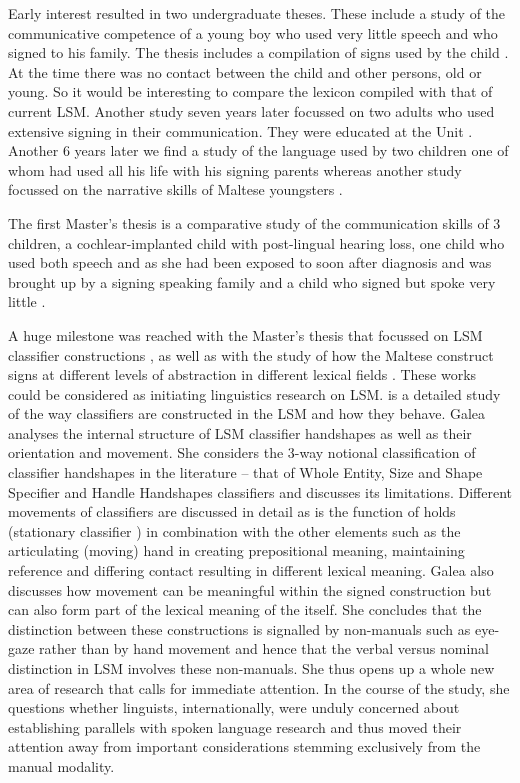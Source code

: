 \documentclass[output=paper]{langsci/langscibook}
\begin{document}
\newpage 
Early interest resulted in two undergraduate theses.  These include a
study of the communicative competence of a young  boy who used
very little speech and who signed to his family.  The thesis includes
a compilation of signs used by the child \citep{d88}.  At
the time there was no contact between the child and other 
persons, old or young.  So it would be interesting to compare the
lexicon compiled with that of current LSM. Another study seven years
later focussed on two  adults who used extensive signing in their
communication.  They were educated at the  Unit
\citep{p95}. Another 6 years later we find a study of the 
language used by two children one of whom had used  all
his life with his signing  parents \citep{azz2001} whereas
another %
study focussed on the narrative skills of Maltese youngsters
\citep{f02}.

The first Master’s thesis is a comparative study of the communication
skills of 3  children, a cochlear-implanted child with
post-lingual hearing loss, one  child who used both speech and
 as she had been exposed to  soon after diagnosis and was
brought up by a signing speaking family and a  child who signed
but spoke very little \citep{a05}.

A huge milestone was reached with the Master’s thesis that focussed on
LSM classifier constructions \citep{g06}, as well as with the
study of how the Maltese  construct signs at different levels of
abstraction in different lexical fields \citep{m10}. These
works could be considered as initiating  linguistics research on
LSM. \citet{g06} is a detailed study of the way classifiers are
constructed in the LSM and how they behave. Galea analyses the
internal structure of LSM classifier handshapes as well as their
orientation and movement.  She considers the 3-way notional
classification of classifier handshapes in the literature – that of
Whole Entity, Size and Shape Specifier and Handle Handshapes
classifiers and discusses its limitations.  Different movements of
classifiers are discussed in detail as is the function of holds
(stationary classifier ) in combination with the other
elements such as the articulating (moving) hand in creating
prepositional meaning, maintaining reference and differing contact
resulting in different lexical meaning.  Galea also discusses how
movement can be meaningful within the signed construction but can also
form part of the lexical meaning of the  itself. She concludes
that the distinction between these constructions is signalled by
non-manuals such as eye-gaze rather than by hand movement and hence
that the verbal versus nominal distinction in LSM involves these
non-manuals.  She thus opens up a whole new area of research that
calls for immediate attention.  In the course of the study, she
questions whether  linguists, internationally, were unduly
concerned about establishing parallels with spoken language research
and thus moved their attention away from important considerations
stemming exclusively from the manual modality.
\end{document}
